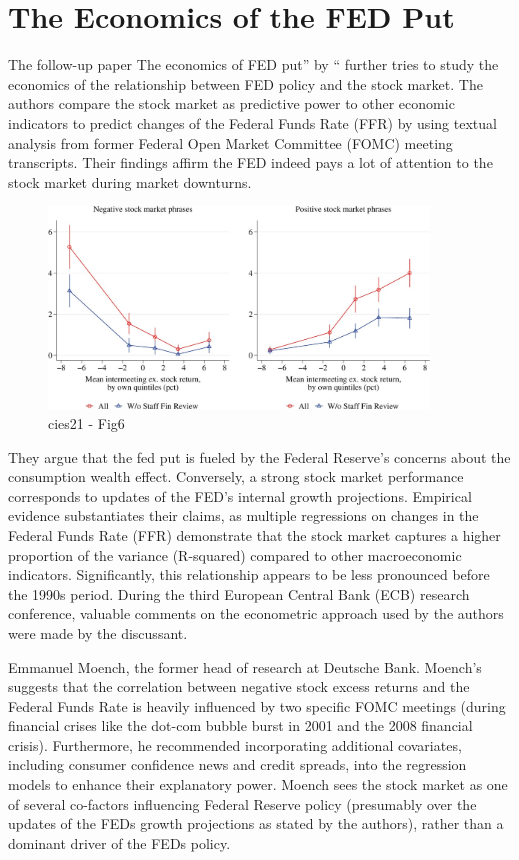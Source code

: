 \section{The Economics of the FED Put}

The follow-up paper The economics of FED put” by \parencite{cieslak_economics_2021}“ further tries to study the economics of the relationship between FED policy and the stock market. 
The authors compare the stock market as predictive power to other economic indicators to predict changes of the Federal Funds Rate (FFR) by using textual analysis from former Federal Open Market Committee (FOMC) meeting transcripts.
Their findings affirm the FED indeed pays a lot of attention to the stock market during market downturns.

\begin{figure}[h]
    \centering
    \includegraphics[width=0.9\textwidth]{figures/cies21/Figure6}
    \caption{cies21 - Fig6}
\end{figure}


They argue that the fed put is fueled by the Federal Reserve's concerns about the consumption wealth effect. Conversely, a strong stock market performance corresponds to updates of the FED’s internal growth projections.
Empirical evidence substantiates their claims, as multiple regressions on changes in the Federal Funds Rate (FFR) demonstrate that the stock market captures a higher proportion of the variance (R-squared) compared to other macroeconomic indicators. Significantly, this relationship appears to be less pronounced before the 1990s period.
During the third European Central Bank (ECB) research conference, valuable comments on the econometric approach used by the authors were made by the discussant.

 Emmanuel Moench, the former head of research at Deutsche Bank. Moench's suggests that the correlation between negative stock excess returns and the Federal Funds Rate is heavily influenced by two specific FOMC meetings (during financial crises like the dot-com bubble burst in 2001 and the 2008 financial crisis).
Furthermore, he recommended incorporating additional covariates, including consumer confidence news and credit spreads, into the regression models to enhance their explanatory power. Moench sees the stock market as one of several co-factors influencing Federal Reserve policy (presumably over the updates of the FEDs growth projections as stated by the authors), rather than a dominant driver of the FEDs policy.




